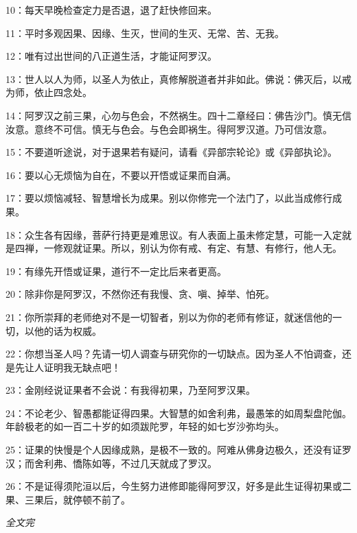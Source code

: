 \documentclass{book}
\begin{document}
10：每天早晚检查定力是否退，退了赶快修回来。

11：平时多观因果、因缘、生灭，世间的生灭、无常、苦、无我。

12：唯有过出世间的八正道生活，才能证阿罗汉。

13：世人以人为师，以圣人为依止，真修解脱道者并非如此。佛说：佛灭后，以戒为师，依止四念处。

14：阿罗汉之前三果，心勿与色会，不然祸生。四十二章经曰：佛告沙门。慎无信汝意。意终不可信。慎无与色会。与色会即祸生。得阿罗汉道。乃可信汝意。

15：不要道听途说，对于退果若有疑问，请看《异部宗轮论》或《异部执论》。

16：要以心无烦恼为自在，不要以开悟或证果而自满。

17：要以烦恼减轻、智慧增长为成果。别以你修完一个法门了，以此当成修行成果。

18：众生各有因缘，菩萨行持更是难思议。有人表面上虽未修定慧，可能一入定就是四禅，一修观就证果。所以，别认为你有戒、有定、有慧、有修行，他人无。

19：有缘先开悟或证果，道行不一定比后来者更高。

20：除非你是阿罗汉，不然你还有我慢、贪、嗔、掉举、怕死。

21：你所崇拜的老师绝对不是一切智者，别以为你的老师有修证，就迷信他的一切，以他的话为权威。

22：你想当圣人吗？先请一切人调查与研究你的一切缺点。因为圣人不怕调查，还是先让人证明我无缺点吧！

23：金刚经说证果者不会说：有我得初果，乃至阿罗汉果。

24：不论老少、智愚都能证得四果。大智慧的如舍利弗，最愚笨的如周梨盘陀伽。年龄极老的如一百二十岁的如须跋陀罗，年轻的如七岁沙弥均头。

25：证果的快慢是个人因缘成熟，是极不一致的。阿难从佛身边极久，还没有证罗汉；而舍利弗、憍陈如等，不过几天就成了罗汉。

26：不是证得须陀洹以后，今生努力进修即能得阿罗汉，好多是此生证得初果或二果、三果后，就停顿不前了。

\begin{center}\itshape 全文完\end{center}
\end{document}
